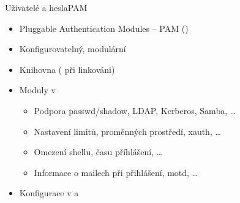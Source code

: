 \begin{frame}{Uživatelé a hesla}{PAM}

  \begin{itemize}
    \item Pluggable Authentication Modules -- PAM ()
    \item Konfigurovatelný, modulární

    \pause

    \item Knihovna  ( při linkováni)

    \pause

    \item Moduly v 
    \begin{itemize}
      \item Podpora passwd/shadow, LDAP, Kerberos, Samba, \dots
      \item Nastavení limitů, proměnných prostředí, xauth, \dots
      \item Omezení shellu, času příhlášení, \dots
      \item Informace o mailech při přihlášení, motd, \dots
    \end{itemize}

    \pause

    \item Konfigurace v  a 
  \end{itemize}

\end{frame}

